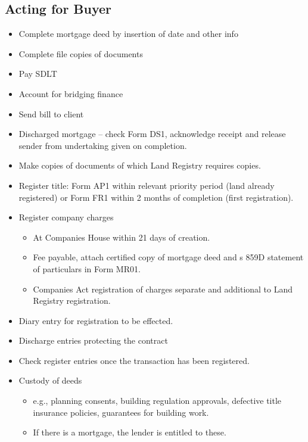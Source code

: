 \documentclass[
]{article}
\providecommand{\tightlist}{%
  \setlength{\itemsep}{0pt}\setlength{\parskip}{0pt}}
\begin{document}
\hypertarget{acting-for-buyer}{%
\subsection{Acting for Buyer}\label{acting-for-buyer}}

\begin{itemize}
\tightlist
\item
  Complete mortgage deed by insertion of date and other info
\item
  Complete file copies of documents
\item
  Pay SDLT
\item
  Account for bridging finance
\item
  Send bill to client
\item
  Discharged mortgage -- check Form DS1, acknowledge receipt and release
  sender from undertaking given on completion.
\item
  Make copies of documents of which Land Registry requires copies.
\item
  Register title: Form AP1 within relevant priority period (land already
  registered) or Form FR1 within 2 months of completion (first
  registration).
\item
  Register company charges

  \begin{itemize}
  \tightlist
  \item
    At Companies House within 21 days of creation.
  \item
    Fee payable, attach certified copy of mortgage deed and s 859D
    statement of particulars in Form MR01.
  \item
    Companies Act registration of charges separate and additional to
    Land Registry registration.
  \end{itemize}
\item
  Diary entry for registration to be effected.
\item
  Discharge entries protecting the contract
\item
  Check register entries once the transaction has been registered.
\item
  Custody of deeds

  \begin{itemize}
  \tightlist
  \item
    e.g., planning consents, building regulation approvals, defective
    title insurance policies, guarantees for building work.
  \item
    If there is a mortgage, the lender is entitled to these.
  \end{itemize}
\end{itemize}
\end{document}

